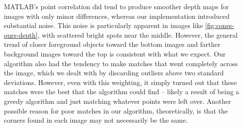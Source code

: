 MATLAB's point correlation did tend to produce smoother depth maps for images with only minor differences, whereas our implementation introduced substantial noise. This noise is particularly apparent in images like \ref{fig:cones-ours-depth}, with scattered bright spots near the middle. However, the general trend of closer foreground objects toward the bottom images and farther background images toward the top is consistent with what we expect. Our algorithm also had the tendency to make matches that went completely across the image, which we dealt with by discarding outliers above two standard deviations. However, even with this weighting, it simply turned out that these matches were the best that the algorithm could find -- likely a result of being a greedy algorithm and just matching whatever points were left over.  Another possible reason for poor matches in our algorithm, theoretically, is that the corners found in each image may not necessarily be the same.
